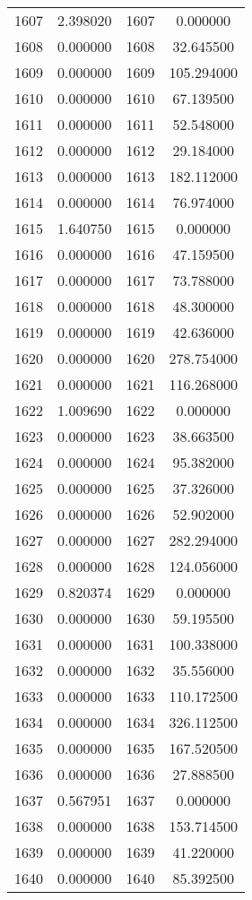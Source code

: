 \documentclass[12pt]{article}
\begin{document}
\begin{longtable}{@{}cccc@{}}
1607 & 2.398020 & 1607 & 0.000000 \\
1608 & 0.000000 & 1608 & 32.645500 \\
1609 & 0.000000 & 1609 & 105.294000 \\
1610 & 0.000000 & 1610 & 67.139500 \\
1611 & 0.000000 & 1611 & 52.548000 \\
1612 & 0.000000 & 1612 & 29.184000 \\
1613 & 0.000000 & 1613 & 182.112000 \\
1614 & 0.000000 & 1614 & 76.974000 \\
1615 & 1.640750 & 1615 & 0.000000 \\
1616 & 0.000000 & 1616 & 47.159500 \\
1617 & 0.000000 & 1617 & 73.788000 \\
1618 & 0.000000 & 1618 & 48.300000 \\
1619 & 0.000000 & 1619 & 42.636000 \\
1620 & 0.000000 & 1620 & 278.754000 \\
1621 & 0.000000 & 1621 & 116.268000 \\
1622 & 1.009690 & 1622 & 0.000000 \\
1623 & 0.000000 & 1623 & 38.663500 \\
1624 & 0.000000 & 1624 & 95.382000 \\
1625 & 0.000000 & 1625 & 37.326000 \\
1626 & 0.000000 & 1626 & 52.902000 \\
1627 & 0.000000 & 1627 & 282.294000 \\
1628 & 0.000000 & 1628 & 124.056000 \\
1629 & 0.820374 & 1629 & 0.000000 \\
1630 & 0.000000 & 1630 & 59.195500 \\
1631 & 0.000000 & 1631 & 100.338000 \\
1632 & 0.000000 & 1632 & 35.556000 \\
1633 & 0.000000 & 1633 & 110.172500 \\
1634 & 0.000000 & 1634 & 326.112500 \\
1635 & 0.000000 & 1635 & 167.520500 \\
1636 & 0.000000 & 1636 & 27.888500 \\
1637 & 0.567951 & 1637 & 0.000000 \\
1638 & 0.000000 & 1638 & 153.714500 \\
1639 & 0.000000 & 1639 & 41.220000 \\
1640 & 0.000000 & 1640 & 85.392500 \\

\end{longtable}
\end{document}
